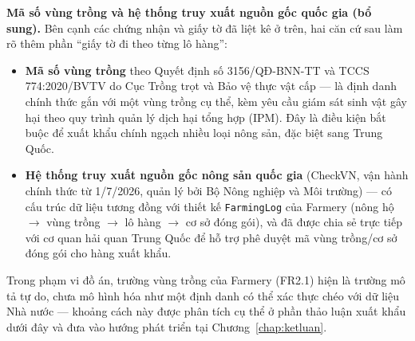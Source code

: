 %


\noindent\textbf{Mã số vùng trồng và hệ thống truy xuất nguồn gốc quốc gia (bổ sung).} Bên cạnh các chứng nhận và giấy tờ đã liệt kê ở trên, hai căn cứ sau làm rõ thêm phần ``giấy tờ đi theo từng lô hàng'':
\begin{itemize}
    \item \textbf{Mã số vùng trồng} theo Quyết định số 3156/QĐ-BNN-TT và TCCS 774:2020/BVTV do Cục Trồng trọt và Bảo vệ thực vật cấp --- là định danh chính thức gắn với một vùng trồng cụ thể, kèm yêu cầu giám sát sinh vật gây hại theo quy trình quản lý dịch hại tổng hợp (IPM). Đây là điều kiện bắt buộc để xuất khẩu chính ngạch nhiều loại nông sản, đặc biệt sang Trung Quốc.
    \item \textbf{Hệ thống truy xuất nguồn gốc nông sản quốc gia} (CheckVN, vận hành chính thức từ 1/7/2026, quản lý bởi Bộ Nông nghiệp và Môi trường) --- có cấu trúc dữ liệu tương đồng với thiết kế \texttt{FarmingLog} của Farmery (nông hộ $\to$ vùng trồng $\to$ lô hàng $\to$ cơ sở đóng gói), và đã được chia sẻ trực tiếp với cơ quan hải quan Trung Quốc để hỗ trợ phê duyệt mã vùng trồng/cơ sở đóng gói cho hàng xuất khẩu.
\end{itemize}
Trong phạm vi đồ án, trường vùng trồng của Farmery (FR2.1) hiện là trường mô tả tự do, chưa mô hình hóa như một định danh có thể xác thực chéo với dữ liệu Nhà nước --- khoảng cách này được phân tích cụ thể ở phần thảo luận xuất khẩu dưới đây và đưa vào hướng phát triển tại Chương~\ref{chap:ketluan}.

